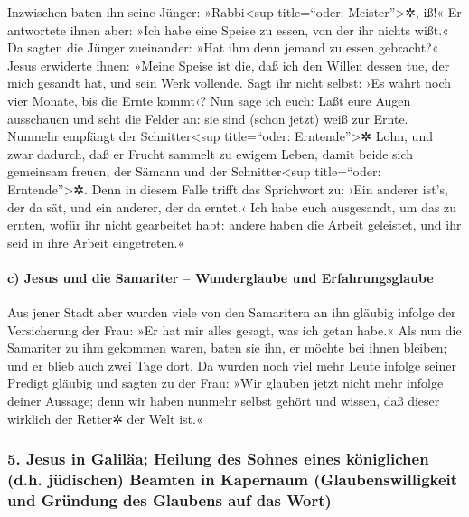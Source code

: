 Inzwischen baten ihn seine Jünger: »Rabbi\textless sup
title=``oder: Meister''\textgreater✲, iß!«  Er antwortete
ihnen aber: »Ich habe eine Speise zu essen, von der ihr nichts wißt.«
 Da sagten die Jünger zueinander: »Hat ihm denn jemand zu
essen gebracht?«  Jesus erwiderte ihnen: »Meine Speise
ist die, daß ich den Willen dessen tue, der mich gesandt hat, und sein
Werk vollende.  Sagt ihr nicht selbst: ›Es währt noch
vier Monate, bis die Ernte kommt‹? Nun sage ich euch: Laßt eure Augen
ausschauen und seht die Felder an: sie sind (schon jetzt) weiß zur
Ernte.  Nunmehr empfängt der Schnitter\textless sup
title=``oder: Erntende''\textgreater✲ Lohn, und zwar dadurch, daß er
Frucht sammelt zu ewigem Leben, damit beide sich gemeinsam freuen, der
Sämann und der Schnitter\textless sup title=``oder:
Erntende''\textgreater✲.  Denn in diesem Falle trifft das
Sprichwort zu: ›Ein anderer ist's, der da sät, und ein anderer, der da
erntet.‹  Ich habe euch ausgesandt, um das zu ernten,
wofür ihr nicht gearbeitet habt: andere haben die Arbeit geleistet, und
ihr seid in ihre Arbeit eingetreten.«

\hypertarget{c-jesus-und-die-samariter-wunderglaube-und-erfahrungsglaube}{%
\paragraph{c) Jesus und die Samariter -- Wunderglaube und
Erfahrungsglaube}\label{c-jesus-und-die-samariter-wunderglaube-und-erfahrungsglaube}}

 Aus jener Stadt aber wurden viele von den Samaritern an
ihn gläubig infolge der Versicherung der Frau: »Er hat mir alles gesagt,
was ich getan habe.«  Als nun die Samariter zu ihm
gekommen waren, baten sie ihn, er möchte bei ihnen bleiben; und er blieb
auch zwei Tage dort.  Da wurden noch viel mehr Leute
infolge seiner Predigt gläubig  und sagten zu der Frau:
»Wir glauben jetzt nicht mehr infolge deiner Aussage; denn wir haben
nunmehr selbst gehört und wissen, daß dieser wirklich der Retter✲ der
Welt ist.«

\hypertarget{jesus-in-galiluxe4a-heilung-des-sohnes-eines-kuxf6niglichen-d.h.-juxfcdischen-beamten-in-kapernaum-glaubenswilligkeit-und-gruxfcndung-des-glaubens-auf-das-wort}{%
\subsubsection{5. Jesus in Galiläa; Heilung des Sohnes eines königlichen
(d.h. jüdischen) Beamten in Kapernaum (Glaubenswilligkeit und Gründung
des Glaubens auf das
Wort)}\label{jesus-in-galiluxe4a-heilung-des-sohnes-eines-kuxf6niglichen-d.h.-juxfcdischen-beamten-in-kapernaum-glaubenswilligkeit-und-gruxfcndung-des-glaubens-auf-das-wort}}


